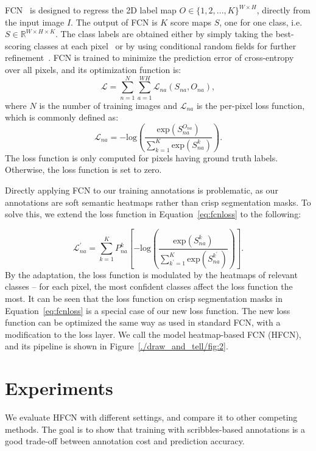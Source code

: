 FCN~\citep{Long_2015_CVPR} is designed to regress the 2D label map $O
\in \{1,2,..., K\}^{W \times H}$, directly from the input image $I$.  The output of FCN is 
$K$ score maps $S$, one for one class, i.e. $S \in \mathbb{R}^{W \times 
H \times K}$.  The class labels are obtained either by simply taking the
best-scoring classes at each pixel~\citep{Long_2015_CVPR} or by using
conditional random fields for further refinement~\citep{cnn:em}. FCN 
is trained to minimize the prediction error of cross-entropy over all 
pixels, and its optimization function is:
\begin{equation}
  \label{eq:fcn}
  \mathcal{L} = \sum_{n=1}^N  \sum_{a=1}^{WH}  \mathcal{L}_{na}(S_{na}, O_{na}),
\end{equation}
where $N$ is the number of training images and $\mathcal{L}_{na}$ is
the per-pixel loss function, which is commonly defined as: 
\begin{equation}
  \label{eq:fcnloss}
\mathcal{L}_{na} =  -\text{log} \left( \frac{ \text{exp}(S_{na}^{O_{na}})} {\sum_{k=1}^K \text{exp}(S_{na}^k)} \right).   
\end{equation}
The loss function is only computed for pixels having ground truth
labels. Otherwise, the loss function is set to zero.
 

Directly applying FCN to our training annotations is problematic, as
our annotations are soft semantic heatmaps rather than crisp
segmentation masks. To solve this, we extend the loss function in
Equation~\ref{eq:fcnloss} to the following:

\begin{equation}
  \label{eq:ourloss}
\mathcal{L}_{na}^\prime =  \sum_{k=1}^K P_{na}^k \left[ -\text{log} (\frac{ \text{exp}(S_{na}^k)} {\sum_{k^{\prime}=1}^K \text{exp}(S_{na}^{k^\prime})}) \right].    
\end{equation}
By the adaptation, the loss function is modulated by the heatmaps of
relevant classes -- for each pixel, the most confident classes affect
the loss function the most.  It can be seen that the loss function on
crisp segmentation masks in Equation~\ref{eq:fcnloss} is a special case of
our new loss function. The new loss function can be optimized the same
way as used in standard FCN, with a modification to the loss layer.
We call the model heatmap-based FCN (HFCN), and its pipeline is shown
in Figure~\ref{./draw_and_tell/fig:2}.


\section{Experiments}
\label{drawtell:sec:experiments}
We evaluate HFCN with different settings, and compare it to other
competing methods. The goal is to show that training with
scribbles-based annotations is a good trade-off between annotation
cost and prediction accuracy.

